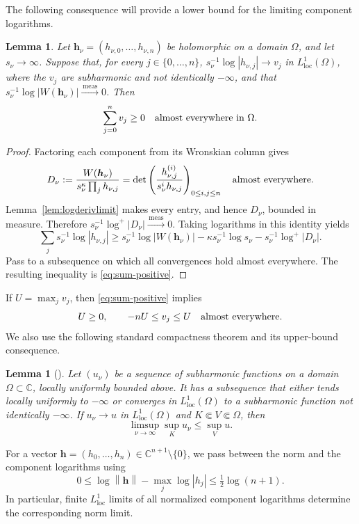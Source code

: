 \documentclass[11pt,letterpaper,reqno]{amsart}
\newtheorem{lem}[thm]{Lemma}
\theoremstyle{remark}
\numberwithin{equation}{section}
\newcommand{\C}{\mathbb C}
\newcommand{\loc}{\mathrm{loc}}
\newcommand{\norm}[1]{\left\lVert#1\right\rVert}
\newcommand{\convmeas}{\xrightarrow{\,\mathrm{meas}\,}}
\newcommand{\hv}{\bm h}
\begin{document}
The following consequence will provide a lower bound for the limiting
component logarithms.

\begin{lem}\label{lem:sum}
Let $\hv_\nu=(h_{\nu,0},\ldots,h_{\nu,n})$ be holomorphic on a domain
$\Omega$, and let $s_\nu\to\infty$. Suppose that, for every
$j\in\{0,\ldots,n\}$,
$s_\nu^{-1}\log|h_{\nu,j}|\to v_j$ in $L^1_{\loc}(\Omega)$, where the $v_j$ are
subharmonic and not identically $-\infty$, and that
$s_\nu^{-1}\log|W(\hv_\nu)|\convmeas0$. Then
\begin{equation}\label{eq:sum-positive}
 \sum_{j=0}^{n}v_j\ge0\quad\hbox{almost everywhere in }\Omega.
\end{equation}
\end{lem}
\begin{proof}
Factoring each component from its Wronskian column gives
\[
 D_\nu:=\frac{W(\hv_\nu)}{s_\nu^\kappa\prod_j h_{\nu,j}}
 =\det\left(\frac{h_{\nu,j}^{(i)}}{s_\nu^ih_{\nu,j}}\right)_{0\le i,j\le n}
 \quad\hbox{almost everywhere}.
\]
Lemma~\ref{lem:logderivlimit} makes every entry, and hence $D_\nu$, bounded
in measure. Therefore $s_\nu^{-1}\log^+|D_\nu|\convmeas0$. Taking logarithms
in this identity yields
\[
 \sum_j s_\nu^{-1}\log|h_{\nu,j}|
 \ge s_\nu^{-1}\log|W(\hv_\nu)|
       -\kappa s_\nu^{-1}\log s_\nu-s_\nu^{-1}\log^+|D_\nu|.
\]
Pass to a subsequence on which all convergences hold almost everywhere.
The resulting inequality is \eqref{eq:sum-positive}.
\end{proof}

If $U=\max_jv_j$, then \eqref{eq:sum-positive} implies
\begin{equation}\label{eq:sandwich}
 U\ge0,\qquad -nU\le v_j\le U\quad\hbox{almost everywhere}.
\end{equation}
We also use the following standard compactness theorem and its upper-bound
consequence.

\begin{lem}[{\cite[Theorem~4.1.9(a),(b)]{Hor03}}]
\label{lem:subharmonic-compactness}
Let $(u_\nu)$ be a sequence of subharmonic functions on a domain
$\Omega\subset\C$, locally uniformly bounded above. It has a subsequence
that either tends locally uniformly to
$-\infty$ or converges in $L^1_{\loc}(\Omega)$ to a subharmonic function not
identically $-\infty$. If $u_\nu\to u$ in $L^1_{\loc}(\Omega)$ and
$K\Subset V\Subset\Omega$, then
\[
 \limsup_{\nu\to\infty}\sup_Ku_\nu\le\sup_Vu.
\]
\end{lem}

For a vector $\hv=(h_0,\ldots,h_n)\in\C^{n+1}\setminus\{0\}$,
we pass between the norm and the component logarithms using
\begin{equation}\label{eq:norm-max}
 0\le\log\norm{\hv}-\max_j\log|h_j|\le\tfrac12\log(n+1).
\end{equation}
In particular, finite $L^1_{\loc}$ limits of all normalized component
logarithms determine the corresponding norm limit.
\end{document}
